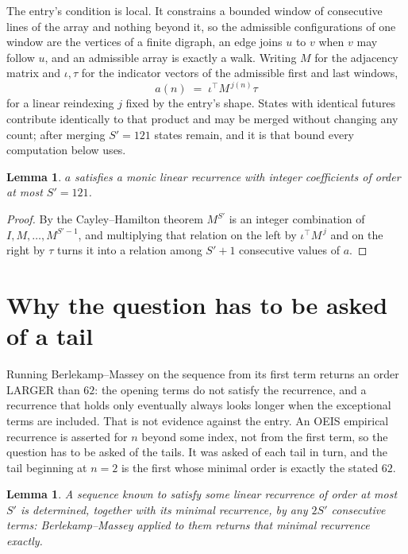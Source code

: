 \documentclass[11pt,a4paper]{article}
\theoremstyle{plain}
\newtheorem{lemma}[theorem]{Lemma}
\theoremstyle{definition}
\begin{document}
The entry's condition is local. It constrains a bounded window of consecutive lines of the
array and nothing beyond it, so the admissible configurations of one window are the vertices of
a finite digraph, an edge joins $u$ to $v$ when $v$ may follow $u$, and an admissible array is
exactly a walk. Writing $M$ for the adjacency matrix and $\iota,\tau$ for the indicator vectors
of the admissible first and last windows,
\[
a(n)\;=\;\iota^{\!\top}M^{\,j(n)}\tau
\]
for a linear reindexing $j$ fixed by the entry's shape. States with identical futures
contribute identically to that product and may be merged without changing any count; after
merging $S'=121$ states remain, and it is that bound every computation below uses.

\begin{lemma}\label{lem:cf}
$a$ satisfies a monic linear recurrence with integer coefficients of order at most $S'=121$.
\end{lemma}

\begin{proof}
By the Cayley--Hamilton theorem $M^{S'}$ is an integer combination of $I,M,\dots,M^{S'-1}$,
and multiplying that relation on the left by $\iota^{\!\top}M^{\,j}$ and on the right by
$\tau$ turns it into a relation among $S'+1$ consecutive values of $a$.
\end{proof}

\section{Why the question has to be asked of a tail}

Running Berlekamp--Massey on the sequence from its first term returns an order LARGER than $62$: the opening terms do not satisfy the recurrence, and a recurrence that holds only eventually always looks longer when the exceptional terms are included. That is not evidence against the entry. An OEIS empirical recurrence is asserted for $n$ beyond some index, not from the first term, so the question has to be asked of the tails. It was asked of each tail in turn, and the tail beginning at $n=2$ is the first whose minimal order is exactly the stated $62$.

\begin{lemma}\label{lem:bm}
A sequence known to satisfy some linear recurrence of order at most $S'$ is determined,
together with its minimal recurrence, by any $2S'$ consecutive terms: Berlekamp--Massey applied
to them returns that minimal recurrence exactly.
\end{lemma}
\end{document}
